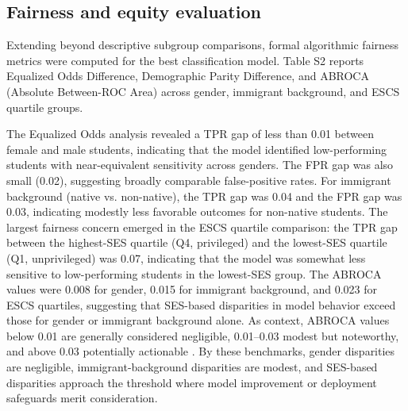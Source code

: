 \documentclass[pdflatex,sn-mathphys-ay]{sn-jnl}
\begin{document}
\subsection{Fairness and equity evaluation}

Extending beyond descriptive subgroup comparisons, formal algorithmic fairness metrics were computed for the best classification model. Table S2 reports Equalized Odds Difference, Demographic Parity Difference, and ABROCA (Absolute Between-ROC Area) across gender, immigrant background, and ESCS quartile groups.

The Equalized Odds analysis revealed a TPR gap of less than 0.01 between female and male students, indicating that the model identified low-performing students with near-equivalent sensitivity across genders. The FPR gap was also small (0.02), suggesting broadly comparable false-positive rates. For immigrant background (native vs. non-native), the TPR gap was 0.04 and the FPR gap was 0.03, indicating modestly less favorable outcomes for non-native students. The largest fairness concern emerged in the ESCS quartile comparison: the TPR gap between the highest-SES quartile (Q4, privileged) and the lowest-SES quartile (Q1, unprivileged) was 0.07, indicating that the model was somewhat less sensitive to low-performing students in the lowest-SES group. The ABROCA values were 0.008 for gender, 0.015 for immigrant background, and 0.023 for ESCS quartiles, suggesting that SES-based disparities in model behavior exceed those for gender or immigrant background alone. As context, ABROCA values below 0.01 are generally considered negligible, 0.01--0.03 modest but noteworthy, and above 0.03 potentially actionable \citep{Gandara_2024_blackbox,Verger_2024_MADD}. By these benchmarks, gender disparities are negligible, immigrant-background disparities are modest, and SES-based disparities approach the threshold where model improvement or deployment safeguards merit consideration.
\end{document}
